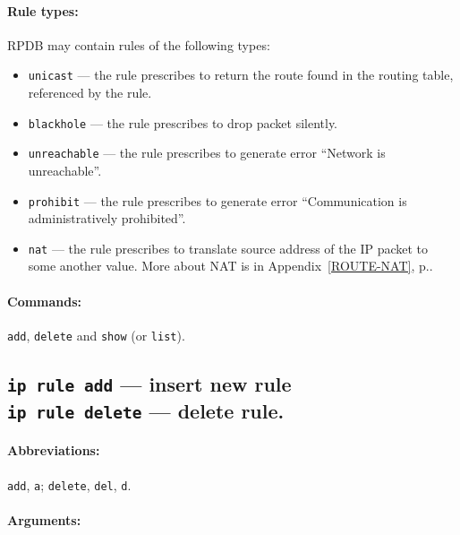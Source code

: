 \paragraph{Rule types:} RPDB may contain rules of the following
types:
\begin{itemize}
\item \verb|unicast| --- the rule prescribes to return the route found
in the routing table, referenced by the rule.
\item \verb|blackhole| --- the rule prescribes to drop packet silently.
\item \verb|unreachable| --- the rule prescribes to generate error ``Network
is unreachable''.
\item \verb|prohibit| --- the rule prescribes to generate error
``Communication is administratively prohibited''.
\item \verb|nat| --- the rule prescribes to translate source address
of the IP packet to some another value. More about NAT is
in Appendix~\ref{ROUTE-NAT}, p.\pageref{ROUTE-NAT}.
\end{itemize}


\paragraph{Commands:} \verb|add|, \verb|delete| and \verb|show|
(or \verb|list|).

\subsection{{\tt ip rule add} --- insert new rule\\
	{\tt ip rule delete} --- delete rule.}
\label{IP-RULE-ADD}

\paragraph{Abbreviations:} \verb|add|, \verb|a|; \verb|delete|, \verb|del|,
	\verb|d|.

\paragraph{Arguments:}

